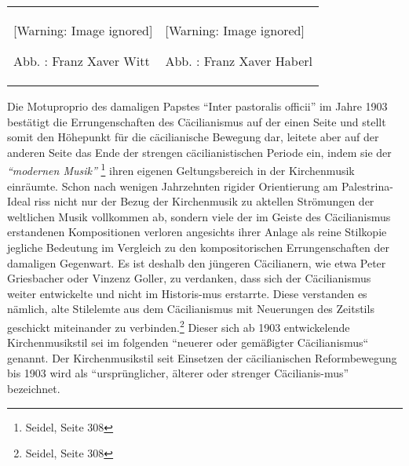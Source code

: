\documentclass[a4paper]{article}
\newcommand\textstyleZitate[1]{\textit{#1}}
\newcounter{Abb}
\renewcommand\theAbb{\arabic{Abb}}
\begin{document}
\begin{center}
\begin{minipage}{6.943cm}
\begin{flushleft}
\tablefirsthead{}
\tablehead{}
\tabletail{}
\tablelasttail{}
\begin{supertabular}{m{3.197cm}m{3.345cm}}
  [Warning: Image ignored] %
 
Abb. \stepcounter{Abb}{\theAbb}: Franz Xaver Witt &
  [Warning: Image ignored] %
 
Abb. \stepcounter{Abb}{\theAbb}: Franz Xaver Haberl\\
\end{supertabular}
\end{flushleft}
\end{minipage}
\end{center}
Die Motuproprio des damaligen Papstes “Inter pastoralis officii” im
Jahre 1903 bestätigt die Errungenschaften des Cäcilianismus auf der
einen Seite und stellt somit den Höhepunkt für die cäcilianische
Bewegung dar, leitete aber auf der anderen Seite das Ende der strengen
cäcilianistischen Periode ein, indem sie der \textstyleZitate{“modernen
Musik” }\footnote{ Seidel, Seite 308} ihren eigenen Geltungsbereich in
der Kirchenmusik einräumte. Schon nach wenigen Jahrzehnten rigider
Orientierung am Palestrina-Ideal riss nicht nur der Bezug der
Kirchenmusik zu aktellen Strömungen der weltlichen Musik vollkommen ab,
sondern viele der im Geiste des Cäcilianismus erstandenen Kompositionen
verloren angesichts ihrer Anlage als reine Stilkopie jegliche Bedeutung
im Vergleich zu den kompositorischen Errungenschaften der damaligen
Gegenwart. Es ist deshalb den jüngeren Cäcilianern, wie etwa Peter
Griesbacher oder Vinzenz Goller, zu verdanken, dass sich der
Cäcilianismus weiter entwickelte und nicht im Historis-mus erstarrte.
Diese verstanden es nämlich, alte Stilelemte aus dem Cäcilianismus mit
Neuerungen des Zeitstils geschickt miteinander zu verbinden.\footnote{
Seidel, Seite 308} Dieser sich ab 1903 entwickelende Kirchenmusikstil
sei im folgenden “neuerer oder gemäßigter Cäcilianismus“ genannt. Der
Kirchenmusikstil seit Einsetzen der cäcilianischen Reformbewegung bis
1903 wird als “ursprünglicher, älterer oder strenger Cäcilianis-mus”
bezeichnet.
\end{document}
